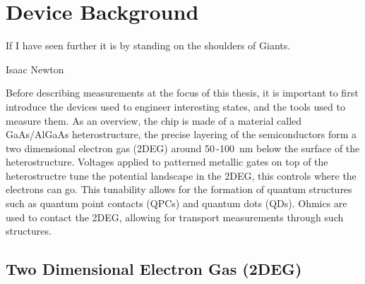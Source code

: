 \chapter{Device Background}\label{cha:device_background}


\epigraph{If I have seen further it is by standing on the shoulders of Giants.}{Isaac Newton}


Before describing measurements at the focus of this thesis, it is important to first introduce the devices used to engineer interesting states, and the tools used to measure them. As an overview, the chip is made of a material called GaAs/AlGaAs heterostructure, the precise layering of the semiconductors form a two dimensional electron gas (2DEG) around 50\,-\qty{100}{nm} below the surface of the heterostructure. Voltages applied to patterned metallic gates on top of the heterostructre tune the potential landscape in the 2DEG, this controls where the electrons can go. This tunability allows for the formation of quantum structures such as quantum point contacts (QPCs) and quantum dots (QDs). Ohmics are used to contact the 2DEG, allowing for transport measurements through such structures. 



\section{Two Dimensional Electron Gas (2DEG)}



